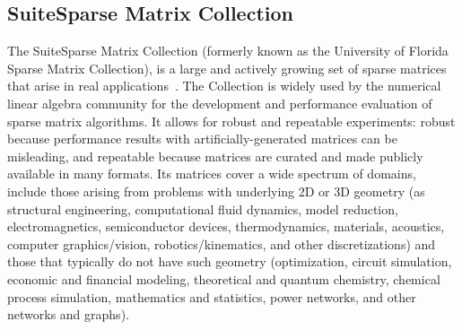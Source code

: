 \subsection{SuiteSparse Matrix Collection}
The SuiteSparse Matrix Collection (formerly known as the University of Florida 
Sparse Matrix Collection), is a large and actively growing set of sparse 
matrices that arise in real applications~\cite{florida}. The Collection is 
widely used by the numerical linear algebra community for the development and 
performance evaluation of sparse matrix algorithms. It allows for robust and 
repeatable experiments: robust because performance results with 
artificially-generated matrices can be misleading, and repeatable because 
matrices are curated and made publicly available in many formats. Its matrices 
cover a wide spectrum of domains, include those arising from problems with 
underlying 2D or 3D geometry (as structural engineering, computational fluid 
dynamics, model reduction, electromagnetics, semiconductor devices, 
thermodynamics, materials, acoustics, computer graphics/vision, 
robotics/kinematics, and other discretizations) and those that typically do not 
have such geometry (optimization, circuit simulation, economic and financial 
modeling, theoretical and quantum chemistry, chemical process simulation, 
mathematics and statistics, power networks, and other networks and graphs). 

